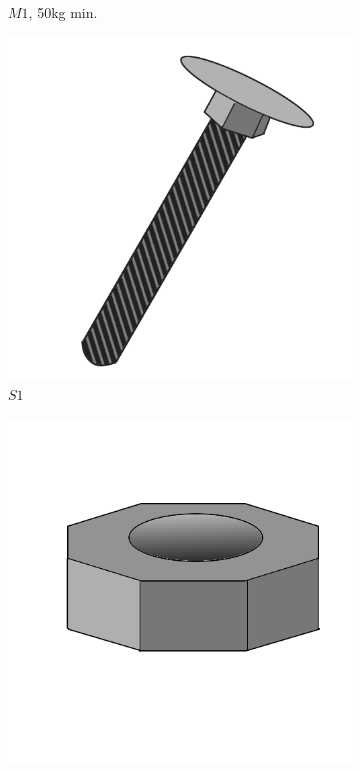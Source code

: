 \documentclass{subfiles}
\begin{document}
\begin{figure}[ht]
\begin{subfigure}[b]{0.3\textwidth}
            \caption{$M1$, 50kg min.}
            \label{fig:M1}
        \end{subfigure}
        \hfill
        \begin{subfigure}[b]{0.3\textwidth}
            \centering
            \includegraphics[width=\textwidth]{Ressources/Piece_S1.png}
            \caption{$S1$}
            \label{fig:S1}
        \end{subfigure}  
        \hfill
        \begin{subfigure}[b]{0.3\textwidth}
            \centering
            \includegraphics[width=\textwidth]{Ressources/Piece_S2.png}

\end{subfigure}
\end{figure}
\end{document}
